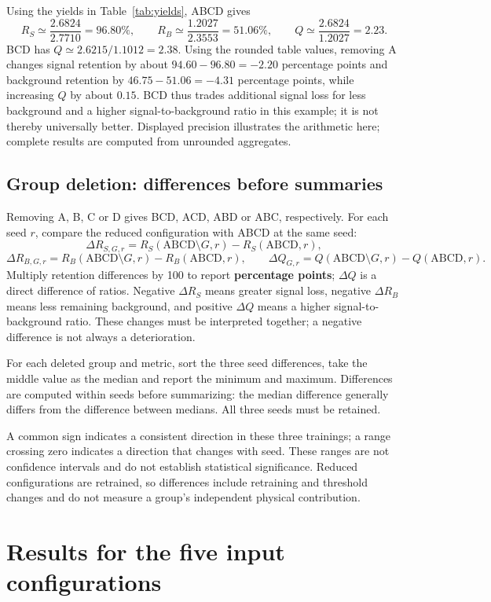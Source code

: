 \documentclass[11pt,a4paper]{article}
\begin{document}
Using the yields in Table~\ref{tab:yields}, ABCD gives
\[
 R_S\simeq\frac{2.6824}{2.7710}=96.80\%,\qquad
 R_B\simeq\frac{1.2027}{2.3553}=51.06\%,\qquad
 Q\simeq\frac{2.6824}{1.2027}=2.23.
\]
BCD has $Q\simeq2.6215/1.1012=2.38$.
Using the rounded table values, removing A changes signal retention by about $94.60-96.80=-2.20$ percentage points and background retention by $46.75-51.06=-4.31$ percentage points, while increasing $Q$ by about $0.15$.
BCD thus trades additional signal loss for less background and a higher signal-to-background ratio in this example; it is not thereby universally better.
Displayed precision illustrates the arithmetic here; complete results are computed from unrounded aggregates.

\subsection{Group deletion: differences before summaries}
Removing A, B, C or D gives BCD, ACD, ABD or ABC, respectively.
For each seed $r$, compare the reduced configuration with ABCD at the same seed:
\[
 \Delta R_{S,G,r}=R_S(\mathrm{ABCD}\setminus G,r)-R_S(\mathrm{ABCD},r),
\]
\[
 \Delta R_{B,G,r}=R_B(\mathrm{ABCD}\setminus G,r)-R_B(\mathrm{ABCD},r),\qquad
 \Delta Q_{G,r}=Q(\mathrm{ABCD}\setminus G,r)-Q(\mathrm{ABCD},r).
\]
Multiply retention differences by 100 to report \textbf{percentage points}; $\Delta Q$ is a direct difference of ratios.
Negative $\Delta R_S$ means greater signal loss, negative $\Delta R_B$ means less remaining background, and positive $\Delta Q$ means a higher signal-to-background ratio.
These changes must be interpreted together; a negative difference is not always a deterioration.

For each deleted group and metric, sort the three seed differences, take the middle value as the median and report the minimum and maximum.
Differences are computed within seeds before summarizing: the median difference generally differs from the difference between medians.
All three seeds must be retained.

A common sign indicates a consistent direction in these three trainings; a range crossing zero indicates a direction that changes with seed.
These ranges are not confidence intervals and do not establish statistical significance.
Reduced configurations are retrained, so differences include retraining and threshold changes and do not measure a group's independent physical contribution.

\FloatBarrier
\section{Results for the five input configurations}
\end{document}
